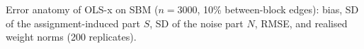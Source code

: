 \begin{table}[t]
\caption{Error anatomy of OLS-x on SBM ($n{=}3000$, 10\% between-block edges): bias, SD of the assignment-induced part $S$, SD of the noise part $N$, RMSE, and realised weight norms (200 replicates).}\label{tab:e3}
\centering\scriptsize
\setlength{\tabcolsep}{2.5pt}

\end{table}
